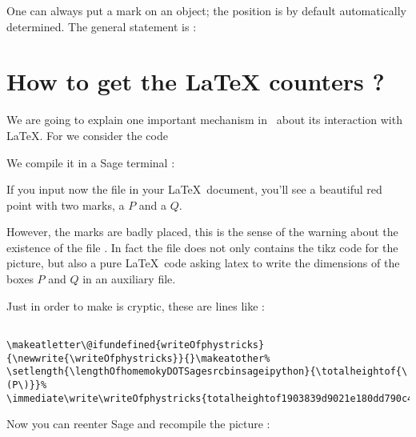 One can always put a mark on an object; the position is by default automatically determined. The general statement is :



\section{How to get the LaTeX counters ?}
\label{SECooKVXMooMKJAXV}

We are going to explain one important mechanism in \phystricks\ about its interaction with \LaTeX. For we consider the code



We compile it in a Sage terminal :



If you input now the file  in your \LaTeX\ document, you'll see a beautiful red point with two marks, a \( P\) and a \( Q\).  

\begin{center}
   
\end{center}

However, the marks are badly placed, this is the sense of the warning about the existence of the file . In fact the file  does not only contains the tikz code for the picture, but also a pure \LaTeX\ code asking latex to write the dimensions of the boxes \( P\) and \( Q\) in an auxiliary file.

Just in order to make is cryptic, these are lines like :
\begin{verbatim}

\makeatletter\@ifundefined{writeOfphystricks}{\newwrite{\writeOfphystricks}}{}\makeatother%
\setlength{\lengthOfhomemokyDOTSagesrcbinsageipython}{\totalheightof{\(P\)}}%
\immediate\write\writeOfphystricks{totalheightof1903839d9021e180dd790c4cc63081c63b2fe6f1:\the\lengthOfhomemokyDOTSagesrcbinsageipython-}
\end{verbatim}

Now you can reenter Sage and recompile the picture :



